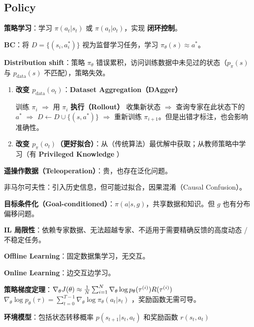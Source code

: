 \documentclass[
  8pt]{extarticle}
\begin{document}
\begin{multicols*}{4}
\hypertarget{policy}{%
\section{Policy}\label{policy}}

\textbf{策略学习}：学习 \(\pi(a_t|s_t)\) 或 \(\pi(a_t|o_t)\)，实现
\textbf{闭环控制}。

\textbf{BC}：将 \(D = \{(s_i, a_i^*)\}\) 视为监督学习任务，学习
\(\pi_\theta(s) \approx a^*\)。

\textbf{Distribution shift}：策略 \(\pi_\theta\)
错误累积，访问训练数据中未见过的状态（\(p_\pi(s)\) 与
\(p_{\text{data}}(s)\) 不匹配），策略失效。

\begin{enumerate}
\def\labelenumi{\arabic{enumi}.}
\item
  \textbf{改变 \(p_{\text{data}}(o_t)\)}：\textbf{Dataset
  Aggregation（DAgger）}

  训练 \(\pi_i\) \(\Rightarrow\) 用 \(\pi_i\) \textbf{执行（Rollout）}
  收集新状态 \(\Rightarrow\) 查询专家在此状态下的 \(a^*\)
  \(\Rightarrow\) \(D \leftarrow D \cup \{(s, a^*)\}\) \(\Rightarrow\)
  重新训练 \(\pi_{i+1}\)。但是出错才标注，也会影响准确性。
\item
  \textbf{改变
  \(p_{\pi}(o_t)\)（更好拟合）}：从（传统算法）最优解中获取；从教师策略中学习（有
  \textbf{Privileged Knowledge} ）
\end{enumerate}

\textbf{遥操作数据（Teleoperation）}：贵，也存在泛化问题。

非马尔可夫性：引入历史信息，但可能过拟合，因果混淆（Causal Confusion）。

\textbf{目标条件化（Goal-conditioned）}：\(\pi(a|s, g)\)，共享数据和知识。但
\(g\) 也有分布偏移问题。

\textbf{IL
局限性}：依赖专家数据、无法超越专家、不适用于需要精确反馈的高度动态 /
不稳定任务。

\textbf{Offline Learning}：固定数据集学习，无交互。

\textbf{Online Learning}：边交互边学习。

\textbf{策略梯度定理}：\(\nabla_\theta J(\theta) \approx \frac{1}{N} \sum_{i=1}^{N} \nabla_\theta \log p_\theta(\tau^{(i)}) R(\tau^{(i)})\\\)
\(\nabla_\theta \log p_\theta(\tau) = \sum_{t=0}^{T-1} \nabla_\theta \log \pi_\theta(a_t | s_t)\)
，奖励函数无需可导。

\textbf{环境模型}：包括状态转移概率 \(p(s_{t+1} | s_t, a_t)\) 和奖励函数
\(r(s_t, a_t)\)


\end{multicols*}
\end{document}

